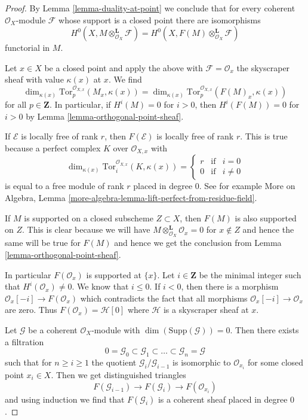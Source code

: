 \begin{proof}
By Lemma \ref{lemma-duality-at-point} we conclude that for every
coherent $\mathcal{O}_X$-module $\mathcal{F}$ whose support is a
closed point there are isomorphisms
$$
H^0(X, M \otimes^\mathbf{L}_{\mathcal{O}_X} \mathcal{F}) =
H^0(X, F(M) \otimes^\mathbf{L}_{\mathcal{O}_X} \mathcal{F})
$$
functorial in $M$.

\medskip\noindent
Let $x \in X$ be a closed point and apply the above with
$\mathcal{F} = \mathcal{O}_x$ the skyscraper sheaf with value
$\kappa(x)$ at $x$. We find
$$
\dim_{\kappa(x)} 
\text{Tor}^{\mathcal{O}_{X, x}}_p(M_x, \kappa(x)) =
\dim_{\kappa(x)} 
\text{Tor}^{\mathcal{O}_{X, x}}_p(F(M)_x, \kappa(x))
$$
for all $p \in \mathbf{Z}$. In particular, if
$H^i(M) = 0$ for $i > 0$, then $H^i(F(M)) = 0$ for $i > 0$
by Lemma \ref{lemma-orthogonal-point-sheaf}.

\medskip\noindent
If $\mathcal{E}$ is locally free of rank $r$, then
$F(\mathcal{E})$ is locally free of rank $r$. This is
true because a perfect complex $K$ over $\mathcal{O}_{X, x}$
with
$$
\dim_{\kappa(x)} \text{Tor}^{\mathcal{O}_{X, x}}_i(K, \kappa(x)) =
\left\{
\begin{matrix}
r & \text{if} & i = 0 \\
0 & \text{if} & i \not = 0
\end{matrix}
\right.
$$
is equal to a free module of rank $r$ placed in degree $0$. See
for example More on Algebra, Lemma
\ref{more-algebra-lemma-lift-perfect-from-residue-field}.

\medskip\noindent
If $M$ is supported on a closed subscheme $Z \subset X$, then
$F(M)$ is also supported on $Z$. This is clear because
we will have $M \otimes_{\mathcal{O}_X}^\mathbf{L} \mathcal{O}_x = 0$
for $x \not \in Z$ and hence the same will be true for $F(M)$
and hence we get the conclusion from
Lemma \ref{lemma-orthogonal-point-sheaf}.

\medskip\noindent
In particular $F(\mathcal{O}_x)$ is supported at $\{x\}$.
Let $i \in \mathbf{Z}$ be the minimal integer such that
$H^i(\mathcal{O}_x) \not = 0$. We know that $i \leq 0$.
If $i < 0$, then there is a morphism
$\mathcal{O}_x[-i] \to F(\mathcal{O}_x)$
which contradicts the fact that all morphisms
$\mathcal{O}_x[-i] \to \mathcal{O}_x$ are zero.
Thus $F(\mathcal{O}_x) = \mathcal{H}[0]$ where
$\mathcal{H}$ is a skyscraper sheaf at $x$.

\medskip\noindent
Let $\mathcal{G}$ be a coherent $\mathcal{O}_X$-module with
$\dim(\text{Supp}(\mathcal{G})) = 0$. Then there exists a
filtration
$$
0 = \mathcal{G}_0 \subset \mathcal{G}_1 \subset \ldots \subset
\mathcal{G}_n = \mathcal{G}
$$
such that for $n \geq i \geq 1$ the quotient $\mathcal{G}_i/\mathcal{G}_{i - 1}$
is isomorphic to $\mathcal{O}_{x_i}$ for some closed point $x_i \in X$.
Then we get distinguished triangles
$$
F(\mathcal{G}_{i - 1}) \to F(\mathcal{G}_i) \to F(\mathcal{O}_{x_i})
$$
and using induction we find that $F(\mathcal{G}_i)$ is a
coherent sheaf placed in degree $0$.


\end{proof}
